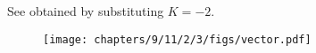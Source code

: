 See 
		 obtained by substituting $K = -2$. 
	\begin{figure}[H]
		\centering
 \texttt{[image: chapters/9/11/2/3/figs/vector.pdf]}
		\caption{}
		\label{fig:9/11/2/3}
  	\end{figure}
